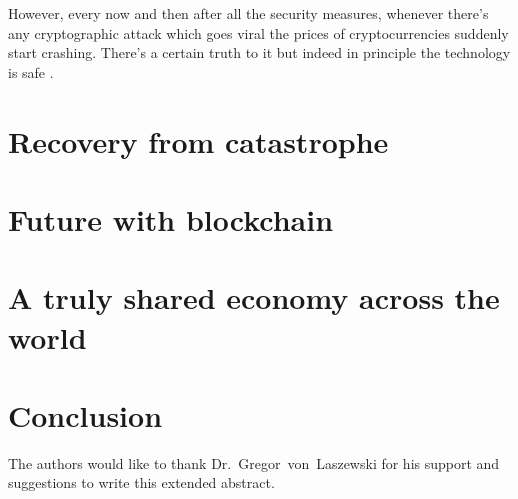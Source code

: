 However, every now and then after all the security measures, whenever there's any cryptographic attack which goes viral the prices of cryptocurrencies suddenly start crashing. There's a certain truth to it but indeed in principle the technology is safe \cite{david36}.



\section{Recovery from catastrophe}
\section{Future with blockchain}
\section{A truly shared economy across the world}
\section{Conclusion}


\begin{acks}

The authors would like to thank Dr.~Gregor~von~Laszewski for his
support and suggestions to write this extended abstract.

\end{acks}



